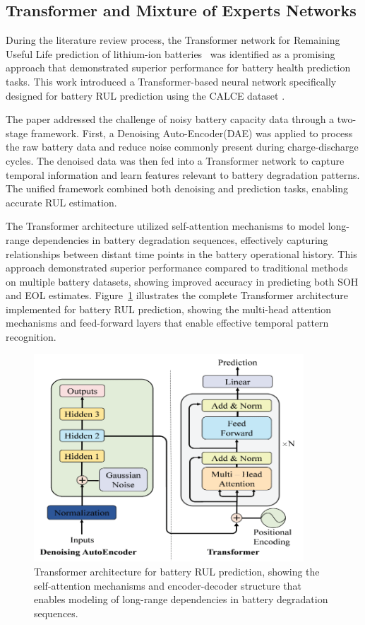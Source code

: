 \subsection{Transformer and Mixture of Experts Networks}
\label{subsec:transformer_moe_networks}

During the literature review process, the Transformer network for Remaining Useful Life prediction of lithium-ion batteries~\cite{chen_transformer_2022} was identified as a promising approach that demonstrated superior performance for battery health prediction tasks. This work introduced a Transformer-based neural network specifically designed for battery RUL prediction using the CALCE dataset \cite{CALCE_battery_nodate}.

The paper addressed the challenge of noisy battery capacity data through a two-stage framework. First, a Denoising Auto-Encoder(DAE) was applied to process the raw battery data and reduce noise commonly present during charge-discharge cycles. The denoised data was then fed into a Transformer network to capture temporal information and learn features relevant to battery degradation patterns. The unified framework combined both denoising and prediction tasks, enabling accurate RUL estimation.

The Transformer architecture utilized self-attention mechanisms to model long-range dependencies in battery degradation sequences, effectively capturing relationships between distant time points in the battery operational history. This approach demonstrated superior performance compared to traditional methods on multiple battery datasets, showing improved accuracy in predicting both SOH and EOL estimates. Figure~\ref{fig:transformer_architecture} illustrates the complete Transformer architecture implemented for battery RUL prediction, showing the multi-head attention mechanisms and feed-forward layers that enable effective temporal pattern recognition.

\begin{figure}[htbp]
\centering
\includegraphics[width=0.9\textwidth]{imgs/transformer_arq.png}
\caption{Transformer architecture for battery RUL prediction, showing the self-attention mechanisms and encoder-decoder structure that enables modeling of long-range dependencies in battery degradation sequences\cite{chen_transformer_2022}.}
\label{fig:transformer_architecture}
\end{figure}

